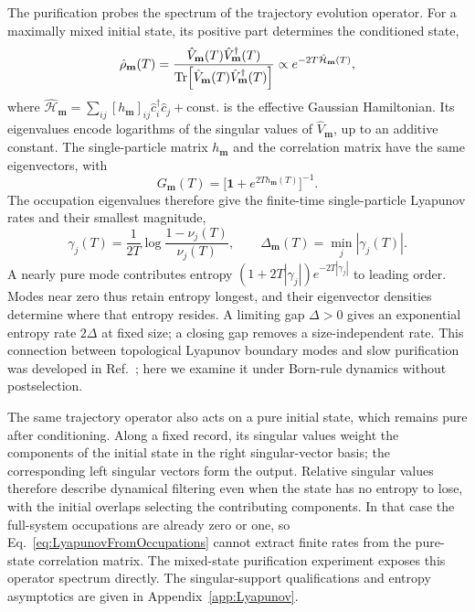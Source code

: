 \documentclass[aps,prb,10pt,twocolumn,superscriptaddress,longbibliography,floatfix]{revtex4-2}
\newcommand{\rec}{\mathbf m}   %
\begin{document}
{The purification probes the spectrum of the trajectory evolution operator. For a maximally mixed initial state, its positive part determines the conditioned state,
\begin{equation}
 \hat\rho_{\rec}(T)=\frac{\hat V_{\rec}(T)\hat V_{\rec}^\dagger(T)}
 {\Tr[\hat V_{\rec}(T)\hat V_{\rec}^\dagger(T)]}
 \propto e^{-2T\hat{\mathcal H}_{\rec}(T)},
 \label{eq:PurificationKrausProduct}
\end{equation}
where $\hat{\mathcal H}_{\rec}=\sum_{ij}[h_{\rec}]_{ij}\hat c_i^\dagger\hat c_j+\mathrm{const.}$ is the effective Gaussian Hamiltonian. Its eigenvalues encode logarithms of the singular values of $\hat V_{\rec}$, up to an additive constant. The single-particle matrix $h_{\rec}$ and the correlation matrix have the same eigenvectors, with
\begin{equation}
 G_{\rec}(T)=\big[\mathbf{1}+e^{2T h_{\rec}(T)}\big]^{-1}.
 \label{eq:PurificationFermiFunction}
\end{equation}
The occupation eigenvalues therefore give the finite-time single-particle Lyapunov rates and their smallest magnitude,
\begin{equation}
 \gamma_j(T)=\frac{1}{2T}\log\frac{1-\nu_j(T)}{\nu_j(T)},\qquad
 \Delta_{\rec}(T)=\min_j|\gamma_j(T)|.
 \label{eq:LyapunovFromOccupations}
\end{equation}
A nearly pure mode contributes entropy $(1+2T|\gamma_j|)e^{-2T|\gamma_j|}$ to leading order. Modes near zero thus retain entropy longest, and their eigenvector densities determine where that entropy resides. A limiting gap $\Delta>0$ gives an exponential entropy rate $2\Delta$ at fixed size; a closing gap removes a size-independent rate. This connection between topological Lyapunov boundary modes and slow purification was developed in Ref.~\cite{XiaoKawabata2026}; here we examine it under Born-rule dynamics without postselection.

The same trajectory operator also acts on a pure initial state, which remains pure after conditioning. Along a fixed record, its singular values weight the components of the initial state in the right singular-vector basis; the corresponding left singular vectors form the output. Relative singular values therefore describe dynamical filtering even when the state has no entropy to lose, with the initial overlaps selecting the contributing components. In that case the full-system occupations are already zero or one, so Eq.~\eqref{eq:LyapunovFromOccupations} cannot extract finite rates from the pure-state correlation matrix. The mixed-state purification experiment exposes this operator spectrum directly. The singular-support qualifications and entropy asymptotics are given in Appendix~\ref{app:Lyapunov}.

}
\end{document}
